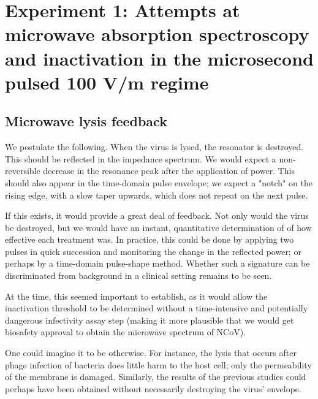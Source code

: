 \documentclass[paper.tex]{subfiles}
\begin{document}
\section{Experiment 1: Attempts at microwave absorption spectroscopy and inactivation in the microsecond pulsed 100 V/m regime}


\subsection{Microwave lysis feedback}

We postulate the following. When the virus is lysed, the resonator is destroyed. This should be reflected in the impedance spectrum.
We would expect a non-reversible decrease in the resonance peak after the application of power. This should also appear in the time-domain pulse envelope; we expect a "notch" on the rising edge, with a slow taper upwards, which does not repeat on the next pulse.

If this exists, it would provide a great deal of feedback. Not only would the virus be destroyed, but we would have an instant, quantitative determination of of how effective each treatment was. In practice, this could be done by applying two pulses in quick succession and monitoring the change in the reflected power; or perhaps by a time-domain pulse-shape method. Whether such a signature can be discriminated from background in a clinical setting remains to be seen.

At the time, this seemed important to establish, as it would allow the inactivation threshold to be determined without a time-intensive and potentially dangerous infectivity assay step (making it more plausible that we would get biosafety approval to obtain the microwave spectrum of NCoV). 

One could imagine it to be otherwise. For instance, the lysis that occurs after phage infection of bacteria does little harm to the host cell; only the permeability of the membrane is damaged\cite{GROWTH}. Similarly, the results of the previous studies could perhaps have been obtained without necessarily destroying the virus' envelope.
\end{document}
